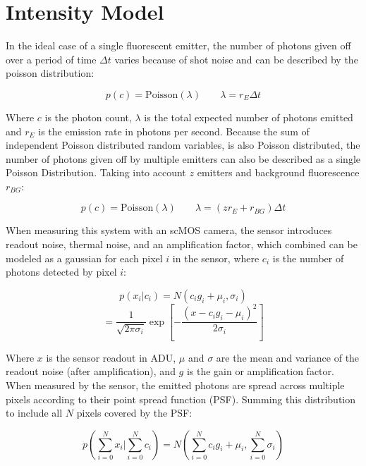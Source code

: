 \section{Intensity Model}

In the ideal case of a single fluorescent emitter, the number of photons given off over a period of time $\Delta t$ varies because of shot noise and can be described by the poisson distribution:

\begin{equation}
	p(c) = \text{Poisson}(\lambda) \;\;\;\;\;\;\; \lambda=r_{E}\Delta t
\end{equation}

Where $c$ is the photon count, $\lambda$ is the total expected number of photons emitted and $r_{E}$ is the emission rate in photons per second.
Because the sum of independent Poisson distributed random variables, is also Poisson distributed, the number of photons given off by multiple emitters can also be described as a single Poisson Distribution. Taking into account $z$ emitters and background fluorescence $r_{BG}$:

\begin{equation}
	p(c) = \text{Poisson}(\lambda) \;\;\;\;\;\;\; \lambda = (z r_{E} + r_{BG})\Delta t
\end{equation}

When measuring this system with an scMOS camera, the sensor introduces readout noise, thermal noise, and an amplification factor, which combined can be modeled as a gaussian for each pixel $i$ in the sensor, where $c_{i}$ is the number of photons detected by pixel $i$:

\begin{equation}
	p(x_{i} | c_{i}) = N( c_{i} g_{i} + \mu_{i}, \sigma_{i})
\end{equation}
\begin{equation*}
	= \frac{1}{\sqrt{2\pi \sigma_{i}} } \exp{ \left[
	- \frac{(x - c_{i}g_{i} - \mu_{i})^{2}}{2 \sigma_{i}} \right]}
\end{equation*}

Where $x$ is the sensor readout in ADU, $\mu$ and $\sigma$ are the mean and variance of the readout noise (after amplification), and $g$ is the gain or amplification factor.
%
When measured by the sensor, the emitted photons are spread across multiple pixels according to their point spread function (PSF). 
Summing this distribution to include all $N$ pixels covered by the PSF:

\begin{equation*}
	p(\sum_{i=0}^{N}x_{i} | \sum_{i=0}^{N}c_{i}) = N\left( \sum_{i=0}^{N}c_{i} g_{i} + \mu_{i}, \sum_{i=0}^{N}\sigma_{i} \right)
\end{equation*}

